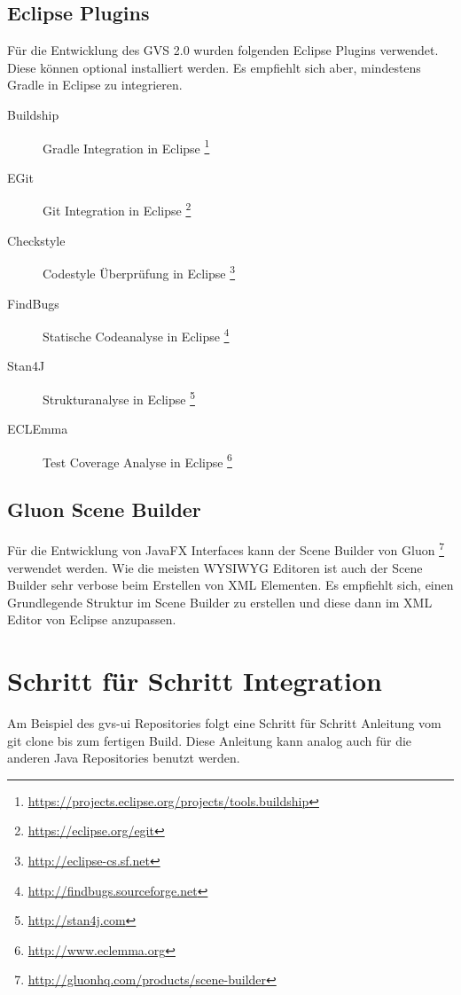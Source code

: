 \documentclass[11pt,a4paper,english,oneside]{book}
\numberwithin{equation}{chapter}
\begin{document}
	\subsection{Eclipse Plugins}
	Für die Entwicklung des GVS 2.0 wurden folgenden Eclipse Plugins verwendet. Diese können optional installiert werden. Es empfiehlt sich aber, mindestens Gradle in Eclipse zu integrieren.
	\begin{description}
		\item[Buildship] Gradle Integration in Eclipse \footnote{\url{https://projects.eclipse.org/projects/tools.buildship}}
		\item[EGit] Git Integration in Eclipse \footnote{\url{https://eclipse.org/egit}}
		\item[Checkstyle] Codestyle Überprüfung in Eclipse \footnote{\url{http://eclipse-cs.sf.net}}
		\item[FindBugs] Statische Codeanalyse in Eclipse \footnote{\url{http://findbugs.sourceforge.net}}
		\item[Stan4J] Strukturanalyse in Eclipse \footnote{\url{http://stan4j.com}}
		\item[ECLEmma] Test Coverage Analyse in Eclipse \footnote{\url{http://www.eclemma.org}}
	\end{description}

	\subsection{Gluon Scene Builder}
	Für die Entwicklung von JavaFX Interfaces kann der Scene Builder von Gluon \footnote{\url{http://gluonhq.com/products/scene-builder}} verwendet werden.  Wie die meisten WYSIWYG Editoren ist auch der Scene Builder sehr verbose beim Erstellen von XML Elementen. Es empfiehlt sich, einen Grundlegende Struktur im Scene Builder zu erstellen und diese dann im XML Editor von Eclipse anzupassen.

	\clearpage
	
	\section{Schritt für Schritt Integration}
	Am Beispiel des gvs-ui Repositories folgt eine Schritt für Schritt Anleitung vom git clone bis zum fertigen Build. Diese Anleitung kann analog auch für die anderen Java Repositories benutzt werden.
	
\end{document}

